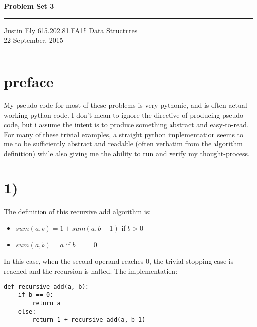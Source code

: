 \documentclass[a4paper,11pt]{article}
\begin{document}
\begin{flushright}

\vspace{1.1cm}

{\bf\Huge Problem Set 3}

\rule{0.25\linewidth}{0.5pt}

\vspace{0.5cm}
Justin Ely
\linebreak
\newline
\footnotesize{615.202.81.FA15 Data Structures \\}
\vspace{0.5cm}
22 September, 2015
\end{flushright}

\noindent\rule{\linewidth}{1.0pt}


\section*{preface}
My pseudo-code for most of these problems is very pythonic, and is often actual working python code.  I don't mean to ignore
the directive of producing pseudo code, but i assume the intent is to produce something abstract and easy-to-read.  For many of these 
trivial examples, a straight python implementation seems to me to be sufficiently abstract and readable (often verbatim from the algorithm definition) while also giving me the ability to run and verify my thought-process.


\section*{1)}

The definition of this recursive add algorithm is: 
\begin{itemize}
  \item $sum(a, b) = 1 + sum(a, b-1)$   if $b > 0$
  \item $sum(a, b) = a$  if $b == 0$
\end{itemize}
  
\noindent In this case, when the second operand reaches 0, the trivial stopping case is reached and the recursion is halted.  The implementation:
  
\begin{verbatim}
def recursive_add(a, b):
    if b == 0:
        return a
    else:
        return 1 + recursive_add(a, b-1)
\end{verbatim}
\end{document}
